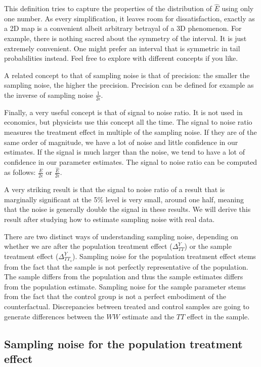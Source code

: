 \documentclass[]{book}
\theoremstyle{definition}
\theoremstyle{definition}
\theoremstyle{definition}
\theoremstyle{remark}
\let\BeginKnitrBlock\begin \let\EndKnitrBlock\end
\begin{document}
This definition tries to capture the properties of the distribution of \(\hat{E}\) using only one number.
As every simplification, it leaves room for dissatisfaction, exactly as a 2D map is a convenient albeit arbitrary betrayal of a 3D phenomenon.
For example, there is nothing sacred about the symmetry of the interval.
It is just extremely convenient.
One might prefer an interval that is symmetric in tail probabilities instead.
Feel free to explore with different concepts if you like.

A related concept to that of sampling noise is that of precision: the smaller the sampling noise, the higher the precision.
Precision can be defined for example as the inverse of sampling noise \(\frac{1}{2\epsilon}\).

Finally, a very useful concept is that of signal to noise ratio.
It is not used in economics, but physicists use this concept all the time.
The signal to noise ratio measures the treatment effect in multiple of the sampling noise.
If they are of the same order of magnitude, we have a lot of noise and little confidence in our estimates.
If the signal is much larger than the noise, we tend to have a lot of confidence in our parameter estimates.
The signal to noise ratio can be computed as follows: \(\frac{E}{2\epsilon}\) or \(\frac{\hat{E}}{2\epsilon}\).

\BeginKnitrBlock{remark}
\iffalse{} {Remark. } \fi{}A very striking result is that the signal to noise ratio of a result that is marginally significant at the 5\% level is very small, around one half, meaning that the noise is generally double the signal in these results.
We will derive this result after studying how to estimate sampling noise with real data.
\EndKnitrBlock{remark}

There are two distinct ways of understanding sampling noise, depending on whether we are after the population treatment effect (\(\Delta^Y_{TT}\)) or the sample treatment effect (\(\Delta^Y_{TT_s}\)).
Sampling noise for the population treatment effect stems from the fact that the sample is not perfectly representative of the population.
The sample differs from the population and thus the sample estimates differs from the population estimate.
Sampling noise for the sample parameter stems from the fact that the control group is not a perfect embodiment of the counterfactual.
Discrepancies between treated and control samples are going to generate differences between the \(WW\) estimate and the \(TT\) effect in the sample.

\hypertarget{sec:illusnoisepop}{%
\subsection{Sampling noise for the population treatment effect}\label{sec:illusnoisepop}}
\end{document}
